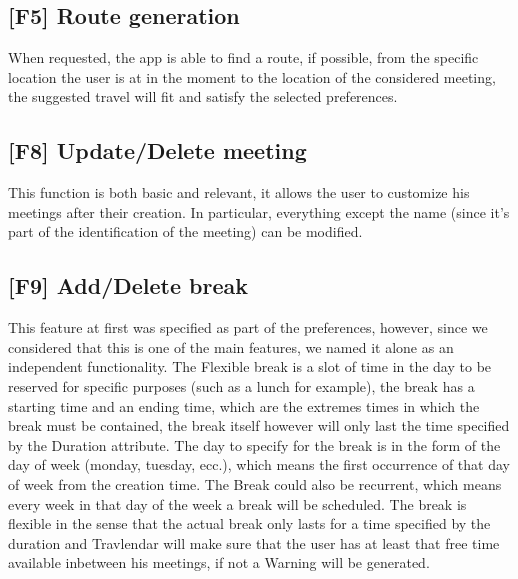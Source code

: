 \subsection{[F5] Route generation}
When requested, the app is able to find a route, if possible, from the specific location the user is at in the moment to the location of the considered meeting, the suggested travel will fit and satisfy the selected preferences.

\subsection{[F8] Update/Delete meeting}
This function is both basic and relevant, it allows the user to customize his meetings after their creation. In particular, everything except the name (since it's part of the identification of the meeting) can be modified.

\subsection{[F9] Add/Delete break}

This feature at first was specified as part of the preferences, however, since we considered that this is one of the main features, we named it alone as an independent functionality. The Flexible break is a slot of time in the day to be reserved for specific purposes (such as a lunch for example), the break has a starting time and an ending time, which are the extremes times in which the break must be contained, the break itself however will only last the time specified by the Duration attribute. The day to specify for the break is in the form of the day of week (monday, tuesday, ecc.), which means the first occurrence of that day of week from the creation time. The Break could also be recurrent, which means every week in that day of the week a break will be scheduled. The break is flexible in the sense that the actual break only lasts for a time specified by the duration and Travlendar will make sure that the user has at least that free time available inbetween his meetings, if not a Warning will be generated.



 
